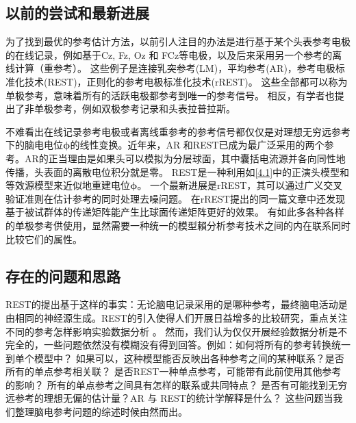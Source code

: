 \subsection{以前的尝试和最新进展}
为了找到最优的参考估计方法，以前引人注目的办法是进行基于某个头表参考电极的在线记录，例如基于Cz, Fz, Oz 和 FCz等电极，以及后来采用另一个参考的离线计算（重参考）。 这些例子是连接乳突参考(LM)，平均参考(AR)，参考电极标准化技术(REST)，正则化的参考电极标准化技术(rREST)。 这些全部都可以称为单极参考，意味着所有的活跃电极都参考到唯一的参考信号。 相反，有学者也提出了非单极参考，例如双极参考记录和头表拉普拉斯。

不难看出在线记录参考电极或者离线重参考的参考信号都仅仅是对理想无穷远参考下的脑电电位$\mathbf{\phi}$的线性变换。近年来，AR
和REST已成为最广泛采用的两个参考。AR的正当理由是如果头可以模拟为分层球面，其中囊括电流源并各向同性地传播，头表面的离散电位积分就是零。 REST是一种利用如\eqref{4.1}中的正演头模型和等效源模型来近似地重建电位$\mathbf{\phi}$。 一个最新进展是rREST，其可以通过广义交叉验证准则在估计参考的同时处理去噪问题。 在rREST提出的同一篇文章中还发现基于被试群体的传递矩阵能产生比球面传递矩阵更好的效果。 有如此多各种各样的单极参考供使用，显然需要一种统一的模型賴分析参考技术之间的内在联系同时比较它们的属性。

\subsection{存在的问题和思路}
REST的提出基于这样的事实：无论脑电记录采用的是哪种参考，最终脑电活动是由相同的神经源生成。REST的引入使得人们开展日益增多的比较研究，重点关注不同的参考怎样影响实验数据分析 。 然而，我们认为仅仅开展经验数据分析是不完全的，一些问题依然没有模糊没有得到回答。例如：如何将所有的参考转换统一到单个模型中？ 如果可以，这种模型能否反映出各种参考之间的某种联系？是否所有的单点参考相关联？ 是否REST一种单点参考，可能带有此前使用其他参考的影响？ 所有的单点参考之间具有怎样的联系或共同特点？ 是否有可能找到无穷远参考的理想无偏的估计量？AR 与 REST的统计学解释是什么？ 这些问题当我们整理脑电参考问题的综述时候由然而出。


